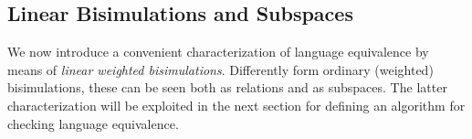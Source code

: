 \documentclass[3p]{elsarticle}
\newcommand{\fL}{\mathcal{L}}    %
\newcommand{\K}{\mathbb{K}}            %
\newtheorem{theorem}{Theorem}
\begin{document}



\subsection{Linear Bisimulations and Subspaces}\label{sec:linearbis}
%
We now introduce a convenient characterization of language
equivalence by means of \emph{linear weighted bisimulations}.
Differently form ordinary (weighted) bisimulations, these can be
seen both as relations and as subspaces. The latter characterization
will be exploited in the next section for defining an algorithm for
checking language equivalence.
\end{document}

